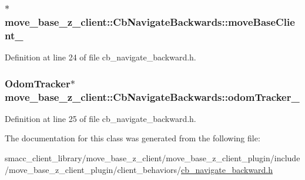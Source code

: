 \subsubsection[{\texorpdfstring{move\+Base\+Client\+\_\+}{moveBaseClient_}}]{$\ast$ move\+\_\+base\+\_\+z\+\_\+client\+::\+Cb\+Navigate\+Backwards\+::move\+Base\+Client\+\_\+}\hypertarget{classmove__base__z__client_1_1CbNavigateBackwards_a02fb173e95d86f655a1dcf1922db7cec}{}\label{classmove__base__z__client_1_1CbNavigateBackwards_a02fb173e95d86f655a1dcf1922db7cec}


Definition at line 24 of file cb\+\_\+navigate\+\_\+backward.\+h.

\subsubsection[{\texorpdfstring{odom\+Tracker\+\_\+}{odomTracker_}}]{\setlength{\rightskip}{0pt plus 5cm}Odom\+Tracker$\ast$ move\+\_\+base\+\_\+z\+\_\+client\+::\+Cb\+Navigate\+Backwards\+::odom\+Tracker\+\_\+}\hypertarget{classmove__base__z__client_1_1CbNavigateBackwards_aa8c42828e7dd7e6ac0d7751a8f61c251}{}\label{classmove__base__z__client_1_1CbNavigateBackwards_aa8c42828e7dd7e6ac0d7751a8f61c251}


Definition at line 25 of file cb\+\_\+navigate\+\_\+backward.\+h.



The documentation for this class was generated from the following file\+:\begin{DoxyCompactItemize}
\item 
smacc\+\_\+client\+\_\+library/move\+\_\+base\+\_\+z\+\_\+client/move\+\_\+base\+\_\+z\+\_\+client\+\_\+plugin/include/move\+\_\+base\+\_\+z\+\_\+client\+\_\+plugin/client\+\_\+behaviors/\hyperlink{cb__navigate__backward_8h}{cb\+\_\+navigate\+\_\+backward.\+h}\end{DoxyCompactItemize}
